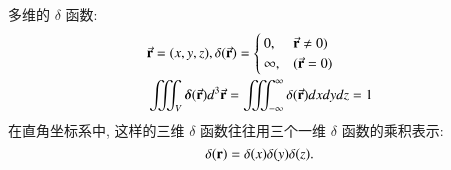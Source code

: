 多维的 $\delta$ 函数:
$$
\begin{aligned}
& \vec{{\mathbf{r}}}=(x,y,z), \delta (\vec{{\mathbf{r}}})= \begin{cases}0, & \vec{{\mathbf{r}}} \neq 0) \\
\infty, & (\vec{{\mathbf{r}}}=0)\end{cases} \\
& \iiint_V \boldsymbol{\delta}(\vec{{\mathbf{r}}})d^3 \vec{{\mathbf{r}}}=\iiint_{-\infty}^{\infty} \delta(\vec{{\mathbf{r}}}) d x d y d z=1
\end{aligned}
$$
在直角坐标系中, 这样的三维 $\delta$ 函数往往用三个一维 $\delta$ 函数的乘积表示:
$$
\delta({\mathbf{r}})=\delta(x) \delta(y) \delta(z).
$$